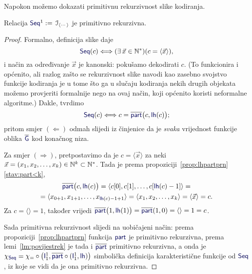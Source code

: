 Napokon možemo dokazati primitivnu rekurzivnost slike kodiranja.

\begin{korolar}[{name=[primitivna rekurzivnost slike kodiranja konačnih nizova]}]\label{kor:Seqprn}
    Relacija $\f{Seq}^1:=\,\im{\langle\cdots\rangle}$ je primitivno rekurzivna.
\end{korolar}
\begin{proof}
Formalno, definicija slike daje
\begin{equation}
    \f{Seq}(c)\Longleftrightarrow(\exists\,\vec x\in\N^*)(c=\langle\vec x\rangle)\text,
\end{equation}
i način za određivanje $\vec x$ je kanonski: pokušamo dekodirati $c$. (To funkcionira i općenito, ali razlog zašto se rekurzivnost slike navodi kao zasebno svojstvo funkcije kodiranja je u tome što ga u slučaju kodiranja nekih drugih objekata možemo provjeriti formalnije nego na ovaj način, koji općenito koristi neformalne algoritme.) Dakle, tvrdimo
\begin{equation}
    \f{Seq}(c)\Longleftrightarrow c\eq\overline{\f{part}}\bigl(c,\f{lh}(c)\bigr)\text;
\end{equation}
pritom smjer $(\Leftarrow)$ odmah slijedi iz činjenice da je \emph{svaka} vrijednost funkcije oblika $\overline{\f G}$ kod konačnog niza.

	Za smjer $(\Rightarrow)$, pretpostavimo da je $c=\langle\vec x\rangle$ za neki $\vec x=(x_1,x_2,\dotsc,x_k)\in{\mathbb N}^k\subset{\mathbb N}^*$. Tada je prema propoziciji~\ref{prop:lhpartprn}\eqref{stav:part<k},
\begin{multline}
    \overline{\f{part}}\bigl(c,\f{lh}(c)\bigr)=\langle c[0],c[1],\dotsc,c[\f{lh}(c)-1]\rangle=\\
    =\langle x_{0+1},x_{1+1},\dotsc,x_{\f{lh}(c)-1+1}\rangle=\langle x_1,x_2,\dotsc,x_k\rangle=\langle\vec x\rangle=c\text.
\end{multline}
Za $c=\langle\rangle=1$, također vrijedi $\overline{\f{part}}\bigl(1,\f{lh}(1)\bigr)=\overline{\f{part}}(1,0)=\langle\rangle=1=c$.

Sada primitivna rekurzivnost slijedi na uobičajeni način: prema propoziciji~\ref{prop:lhpartprn} funkcija $\f{part}$ je primitivno rekurzivna, prema lemi~\ref{lm:povijestrek} je tada i $\overline{\f{part}}$ primitivno rekurzivna, a onda je $\chi_{\f{Seq}}=\chi_\eq\circ\bigl(\f I_1^1,\overline{\f{part}}\circ(\f I_1^1,\f{lh})\bigr)$ simbolička definicija karakteristične funkcije od $\f{Seq}$, iz koje se vidi da je ona primitivno rekurzivna.
\end{proof}

